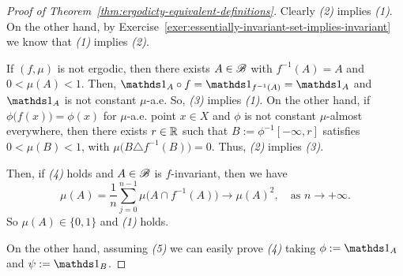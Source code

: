 \begin{proof}[Proof of Theorem~\ref{thm:ergodicty-equivalent-definitions}]
  Clearly \emph{(2)} implies \emph{(1)}. On the other hand, by Exercise~\ref{exer:essentially-invariant-set-implies-invariant} we know that \emph{(1)} implies \emph{(2)}.

  If $(f,\mu)$ is not ergodic, then there exists $A\in\mathscr{B}$ with $f^{-1}(A)=A$ and $0<\mu(A)<1$. Then, $\ds{1}_{A}\circ f= \ds{1}_{f^{-1}(A)} = \ds{1}_{A}$ and $\ds{1}_{A}$ is not constant $\mu$-a.e. So, \emph{(3)} implies \emph{(1)}. On the other hand, if $\phi\big(f(x)\big)=\phi(x)$ for $\mu$-a.e. point $x\in X$ and $\phi$ is not constant $\mu$-almost everywhere, then there exists $r\in\mathbb{R}$ such that $B:=\phi^{-1}[-\infty,r]$ satisfies $0<\mu(B)<1$, with $\mu\big(B\triangle f^{-1}(B)\big)=0$. Thus, \emph{(2)} implies \emph{(3)}.

  Then, if \emph{(4)} holds and $A\in\mathscr{B}$ is $f$-invariant, then we have
  \begin{displaymath}
    \mu(A)=\frac{1}{n}\sum_{j=0}^{n-1}\mu\big(A\cap f^{-1}(A)\big) \to {\mu(A)}^{2},\quad\text{as }n\to+\infty.
  \end{displaymath}
  So $\mu(A)\in\{0,1\}$ and \emph{(1)} holds.

  On the other hand, assuming \emph{(5)} we can easily prove \emph{(4)} taking $\phi:=\ds{1}_{A}$ and $\psi:=\ds{1}_{B}$.


\end{proof}

